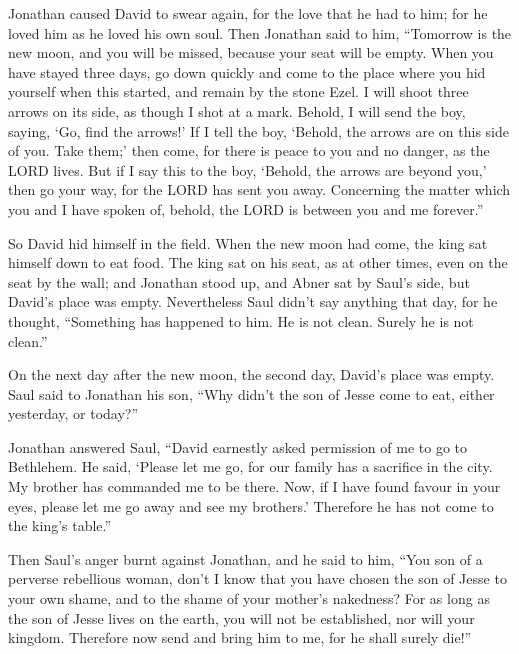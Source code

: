  Jonathan caused David to swear again, for the love that
he had to him; for he loved him as he loved his own soul.
 Then Jonathan said to him, ``Tomorrow is the new moon,
and you will be missed, because your seat will be empty. 
When you have stayed three days, go down quickly and come to the place
where you hid yourself when this started, and remain by the stone Ezel.
 I will shoot three arrows on its side, as though I shot
at a mark.  Behold, I will send the boy, saying, `Go,
find the arrows!' If I tell the boy, `Behold, the arrows are on this
side of you. Take them;' then come, for there is peace to you and no
danger, as the LORD lives.  But if I say this to the boy,
`Behold, the arrows are beyond you,' then go your way, for the LORD has
sent you away.  Concerning the matter which you and I
have spoken of, behold, the LORD is between you and me forever.''

 So David hid himself in the field. When the new moon had
come, the king sat himself down to eat food.  The king
sat on his seat, as at other times, even on the seat by the wall; and
Jonathan stood up, and Abner sat by Saul's side, but David's place was
empty.  Nevertheless Saul didn't say anything that day,
for he thought, ``Something has happened to him. He is not clean. Surely
he is not clean.''

 On the next day after the new moon, the second day,
David's place was empty. Saul said to Jonathan his son, ``Why didn't the
son of Jesse come to eat, either yesterday, or today?''

 Jonathan answered Saul, ``David earnestly asked
permission of me to go to Bethlehem.  He said, `Please
let me go, for our family has a sacrifice in the city. My brother has
commanded me to be there. Now, if I have found favour in your eyes,
please let me go away and see my brothers.' Therefore he has not come to
the king's table.''

 Then Saul's anger burnt against Jonathan, and he said to
him, ``You son of a perverse rebellious woman, don't I know that you
have chosen the son of Jesse to your own shame, and to the shame of your
mother's nakedness?  For as long as the son of Jesse
lives on the earth, you will not be established, nor will your kingdom.
Therefore now send and bring him to me, for he shall surely die!''

